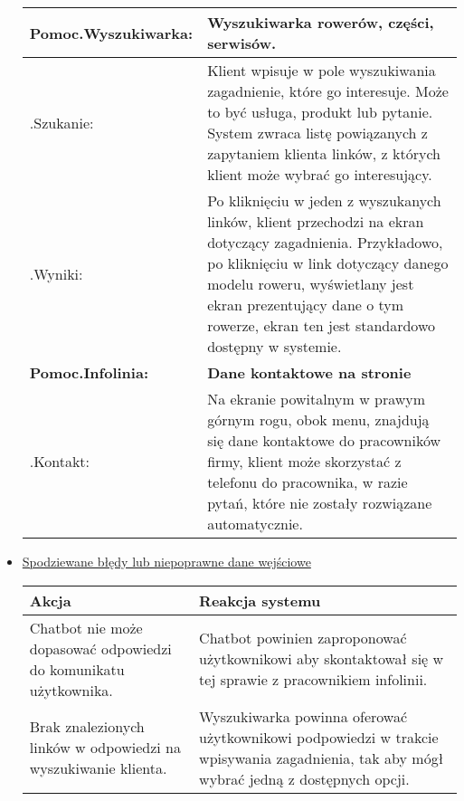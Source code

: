 \documentclass[a4paper,20pt]{article}
\begin{document}
\begin{itemize}
\begin{center}
\begin{tabularx}{\textwidth}[t]{XX}
\arrayrulecolor{black}\hline
\textbf{Pomoc.Wyszukiwarka:} & \textbf{Wyszukiwarka rowerów, części, serwisów.} \\
\hline

\quad .Szukanie: & 
\begin{minipage}[t]{\linewidth}%
Klient wpisuje w pole wyszukiwania zagadnienie, które go interesuje. Może to być usługa, produkt lub pytanie. System zwraca listę powiązanych z zapytaniem klienta linków, z których klient może wybrać go interesujący. 
\end{minipage}\\

\quad .Wyniki: & 
\begin{minipage}[t]{\linewidth}%
Po kliknięciu w jeden z wyszukanych linków, klient przechodzi na ekran dotyczący zagadnienia. Przykładowo, po kliknięciu w link dotyczący danego modelu roweru, wyświetlany jest ekran prezentujący dane o tym rowerze, ekran ten jest standardowo dostępny w systemie.
\end{minipage}\\


\arrayrulecolor{black}\hline
\textbf{Pomoc.Infolinia:} & \textbf{Dane kontaktowe na stronie} \\
\hline

\quad .Kontakt: & 
\begin{minipage}[t]{\linewidth}%
Na ekranie powitalnym w prawym górnym rogu, obok menu, znajdują się dane kontaktowe do pracowników firmy, klient może skorzystać z telefonu do pracownika, w razie pytań, które nie zostały rozwiązane automatycznie. 
\end{minipage}\\


\end{tabularx}
\end{center}



\item \underline{Spodziewane błędy lub niepoprawne dane wejściowe}



\begin{center}
\begin{tabular}{ | m{15em} | m{7cm} | } 
\hline
\textbf{Akcja} & \textbf{Reakcja systemu} \\ 
\hline
Chatbot nie może dopasować odpowiedzi do komunikatu użytkownika. & Chatbot powinien zaproponować użytkownikowi aby skontaktował się w tej sprawie z pracownikiem infolinii.  \\ 
\hline
Brak znalezionych linków w odpowiedzi na wyszukiwanie klienta. & Wyszukiwarka powinna oferować użytkownikowi podpowiedzi w trakcie wpisywania zagadnienia, tak aby mógł wybrać jedną z dostępnych opcji.  \\ 
\hline
\end{tabular}
\end{center}

\end{itemize}
\end{document}
